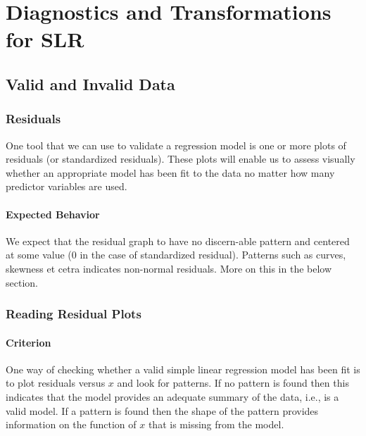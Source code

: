 \documentclass[11pt]{article}
\begin{document}
\section{Diagnostics and Transformations for SLR}
\subsection{Valid and Invalid Data}
\subsubsection{Residuals}
One tool that we can use to validate a regression model is one or more plots of residuals (or standardized residuals). These plots will enable us to assess visually whether an appropriate model has been fit to the data no matter how many predictor variables are used. 

\paragraph{Expected Behavior} We expect that the residual graph to have no discern-able pattern and centered at some value (0 in the case of standardized residual). Patterns such as curves, skewness et cetra indicates non-normal residuals. More on this in the below section.

\subsubsection{Reading Residual Plots}
\paragraph{Criterion} One way of checking whether a valid simple linear regression model has been fit is to plot residuals versus $x$ and look for patterns. If no pattern is found then this indicates that the model provides an adequate summary of the data, i.e., is a valid model. If a pattern is found then the shape of the pattern provides information on the function of $x$ that is missing from the model.  
\end{document}
